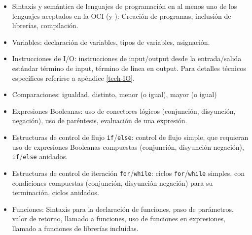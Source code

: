 \begin{itemize}

\item[\basic] Sintaxis y semántica de lenguajes de programación en al menos uno
  de los lenguajes aceptados en la OCI (\java y \cpp): Creación de programas, inclusión de librerías, compilación.

\item[\basic] Variables: declaración de variables, tipos de variables, asignación.

\item[\basic] Instrucciones de I/O: instrucciones de input/output desde la
  entrada/salida estándar término de input, término de línea en output.
  Para detalles técnicos específicos referirse a apéndice \ref{tech-IO}.

\item[\basic] Comparaciones: igualdad, distinto, menor (o igual), mayor (o igual)

\item[\basic] Expresiones Booleanas: uso de conectores lógicos (conjunción, disyunción, negación), uso de paréntesis, evaluación de una expresión.

\item[\basic] Estructuras de control de flujo \texttt{if}/\texttt{else}: control de flujo simple, que requieran uso de expresiones Booleanas compuestas (conjunción, disyunción negación), \texttt{if}/\texttt{else} anidados.

\item[\basic] Estructuras de control de iteración \texttt{for}/\texttt{while}: ciclos \texttt{for}/\texttt{while} simples, con condiciones compuestas (conjunción, disyunción negación) para su terminación, ciclos anidados.

\item[\basic] Funciones: Sintaxis para la declaración de funciones, paso de parámetros, valor de retorno, llamado a funciones, uso
de funciones en expresiones, llamado a funciones de librerías incluidas.
\end{itemize}


